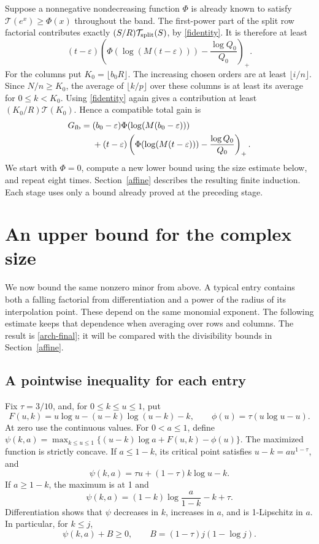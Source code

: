 \documentclass[11pt]{article}
\newcommand{\Tn}{\mathcal T}
\begin{document}
Suppose a nonnegative nondecreasing function \(\Phi\) is already
known to satisfy \(\Tn(e^x)\ge\Phi(x)\) throughout the band.
The first-power part of the split row factorial contributes exactly
\((S/R)\Tn_{\rm split}(S)\), by \eqref{fidentity}. It is therefore
at least
\[
 (t-\varepsilon)
 \left(\Phi(\log(M(t-\varepsilon)))-\frac{\log Q_0}{Q_0}\right)_+.
\]
For the columns put \(K_0=\lfloor b_0R\rfloor\). The increasing
chosen orders are at least \(\lfloor i/n\rfloor\).
Since \(N/n\ge K_0\), the average of \(\lfloor k/p\rfloor\)
over these columns is at least its average for \(0\le k<K_0\).
Using \eqref{fidentity} again gives a contribution at least
\((K_0/R)\Tn(K_0)\). Hence a compatible total gain is
\begin{align}\label{Gfeedback}
 G_{\rm fb}={}&(b_0-\varepsilon)
       \Phi(\log(M(b_0-\varepsilon)))\\
 &+(t-\varepsilon)
       \left(\Phi(\log(M(t-\varepsilon)))-\frac{\log Q_0}{Q_0}\right)_+.
 \notag
\end{align}
We start with \(\Phi=0\), compute a new lower bound using the size
estimate below, and repeat eight times. Section~\ref{affine} describes
the resulting finite induction. Each stage uses only a bound already
proved at the preceding stage.

\section{An upper bound for the complex size}\label{arch}
We now bound the same nonzero minor from above. A typical entry contains
both a falling factorial from differentiation and a power of the radius
of its interpolation point. These depend on the same monomial exponent.
The following estimate keeps that dependence when averaging over rows
and columns. The result is \eqref{arch-final}; it will be compared with
the divisibility bounds in Section~\ref{affine}.

\subsection{A pointwise inequality for each entry}
Fix \(\tau=3/10\), and, for \(0\le k\le u\le1\), put
\[
 F(u,k)=u\log u-(u-k)\log(u-k)-k,\qquad
 \phi(u)=\tau(u\log u-u).
\]
At zero use the continuous values. For \(0<a\le1\), define
\(\psi(k,a)=\max_{k\le u\le1}\{(u-k)\log a+F(u,k)-\phi(u)\}\).
The maximized function is strictly concave. If \(a\le1-k\), its
critical point satisfies \(u-k=au^{1-\tau}\), and
\[
 \psi(k,a)=\tau u+(1-\tau)k\log u-k.
\]
If \(a\ge1-k\), the maximum is at 1 and
\[
 \psi(k,a)=(1-k)\log\frac a{1-k}-k+\tau.
\]
Differentiation shows that \(\psi\) decreases in \(k\), increases in
\(a\), and is 1-Lipschitz in \(a\). In particular, for \(k\le j\),
\[
 \psi(k,a)+B\ge0,\qquad B=(1-\tau)j(1-\log j).
\]
\end{document}
